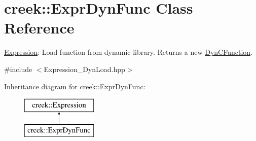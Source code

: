 \hypertarget{classcreek_1_1_expr_dyn_func}{}\section{creek\+:\+:Expr\+Dyn\+Func Class Reference}
\label{classcreek_1_1_expr_dyn_func}


\hyperlink{classcreek_1_1_expression}{Expression}\+: Load function from dynamic library. Returns a new {\ttfamily \hyperlink{classcreek_1_1_dyn_c_function}{Dyn\+C\+Function}}.  




{\ttfamily \#include $<$Expression\+\_\+\+Dyn\+Load.\+hpp$>$}

Inheritance diagram for creek\+:\+:Expr\+Dyn\+Func\+:\begin{figure}[H]
\begin{center}
\leavevmode
\includegraphics[height=2.000000cm]{classcreek_1_1_expr_dyn_func}
\end{center}
\end{figure}
